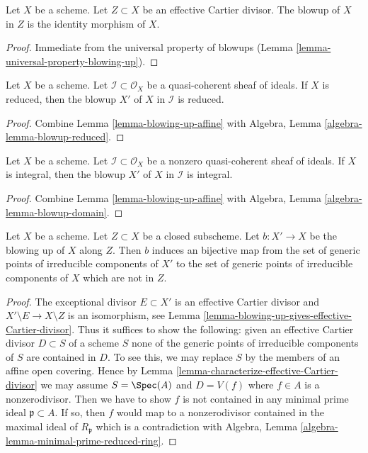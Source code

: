 \begin{lemma}
\label{lemma-blow-up-effective-Cartier-divisor}
Let $X$ be a scheme. Let $Z \subset X$ be an effective Cartier divisor.
The blowup of $X$ in $Z$ is the identity morphism of $X$.
\end{lemma}

\begin{proof}
Immediate from the universal property of blowups
(Lemma \ref{lemma-universal-property-blowing-up}).
\end{proof}

\begin{lemma}
\label{lemma-blow-up-reduced-scheme}
Let $X$ be a scheme. Let $\mathcal{I} \subset \mathcal{O}_X$ be a
quasi-coherent sheaf of ideals. If $X$ is reduced, then the
blowup $X'$ of $X$ in $\mathcal{I}$ is reduced.
\end{lemma}

\begin{proof}
Combine Lemma \ref{lemma-blowing-up-affine}
with Algebra, Lemma \ref{algebra-lemma-blowup-reduced}.
\end{proof}

\begin{lemma}
\label{lemma-blow-up-integral-scheme}
Let $X$ be a scheme. Let $\mathcal{I} \subset \mathcal{O}_X$ be a
nonzero quasi-coherent sheaf of ideals. If $X$ is integral, then the
blowup $X'$ of $X$ in $\mathcal{I}$ is integral.
\end{lemma}

\begin{proof}
Combine Lemma \ref{lemma-blowing-up-affine}
with Algebra, Lemma \ref{algebra-lemma-blowup-domain}.
\end{proof}

\begin{lemma}
\label{lemma-blow-up-and-irreducible-components}
Let $X$ be a scheme. Let $Z \subset X$ be a closed subscheme.
Let $b : X' \to X$ be the blowing up of $X$ along $Z$. Then
$b$ induces an bijective map from the set of generic points
of irreducible components of $X'$ to the set of generic points of
irreducible components of $X$ which are not in $Z$.
\end{lemma}

\begin{proof}
The exceptional divisor $E \subset X'$ is an effective Cartier divisor
and $X' \setminus E \to X \setminus Z$ is an isomorphism, see
Lemma \ref{lemma-blowing-up-gives-effective-Cartier-divisor}.
Thus it suffices to show the following: given an effective
Cartier divisor $D \subset S$ of a scheme $S$ none of the
generic points of irreducible components of $S$ are contained in $D$.
To see this, we may replace $S$ by the members of an affine open
covering. Hence by Lemma \ref{lemma-characterize-effective-Cartier-divisor}
we may assume $S = \Spec(A)$ and $D = V(f)$ where $f \in A$
is a nonzerodivisor. Then we have to show $f$ is not contained
in any minimal prime ideal $\mathfrak p \subset A$.
If so, then $f$ would map to a nonzerodivisor contained
in the maximal ideal of $R_\mathfrak p$ which is a contradiction
with Algebra, Lemma \ref{algebra-lemma-minimal-prime-reduced-ring}.
\end{proof}

